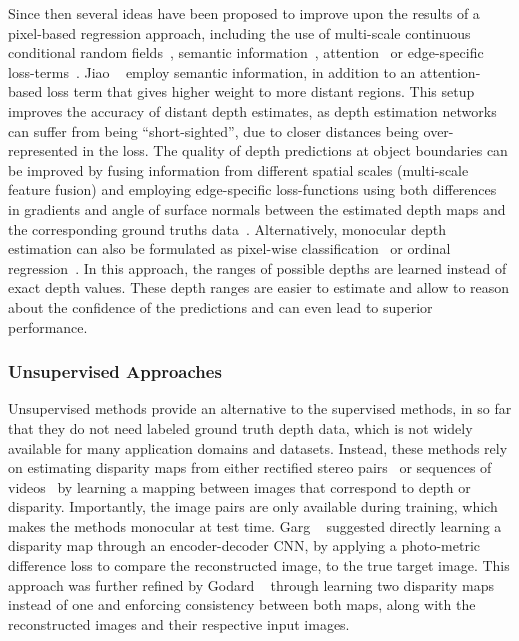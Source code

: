 Since then several ideas have been proposed to improve upon the results of a pixel-based regression approach, including the use of multi-scale continuous conditional random fields~\cite{DBLP:journals/corr/abs-1803-00891}, semantic information~\cite{ramirez2018}, attention~\cite{Jiao2018,Chen2019} or edge-specific loss-terms~\cite{Hu2018}. 
Jiao \etal~\cite{Jiao2018} employ semantic information, in addition to an attention-based loss term that gives higher weight to more distant regions. 
This setup improves the accuracy of distant depth estimates, as depth estimation networks can suffer from being ``short-sighted'', due to closer distances being over-represented in the loss. 
The quality of depth predictions at object boundaries can be improved by fusing information from different spatial scales (multi-scale feature fusion) and employing edge-specific loss-functions using both differences in gradients and angle of surface normals between the estimated depth maps and the corresponding ground truths data~\cite{Hu2018}. 
Alternatively, monocular depth estimation can also be formulated as pixel-wise classification~\cite{Cao2018} or ordinal regression~\cite{Fu2018}. In this approach, the ranges of possible depths are learned instead of exact depth values. These depth ranges are easier to estimate and allow to reason about the confidence of the predictions and can even lead to superior performance. 

\subsubsection{Unsupervised Approaches}

Unsupervised methods provide an alternative to the supervised methods, in so far that they do not need labeled ground truth depth data, which is not widely available for many application domains and datasets.
Instead, these methods rely on estimating disparity maps from either rectified stereo pairs~\cite{garg2016unsupervised,Godard_2017_CVPR} or sequences of videos~\cite{Wang2017,Godard2018} by learning a mapping between images that correspond to depth or disparity. Importantly, the image pairs are only available during training, which makes the methods monocular at test time.
Garg \etal~\cite{garg2016unsupervised} suggested directly learning a disparity map through an encoder-decoder CNN, by applying a photo-metric difference loss to compare the reconstructed image, to the true target image.
This approach was further refined by Godard \etal~\cite{Godard_2017_CVPR} through learning two disparity maps instead of one and enforcing consistency between both maps, along with the reconstructed images and their respective input images. 

